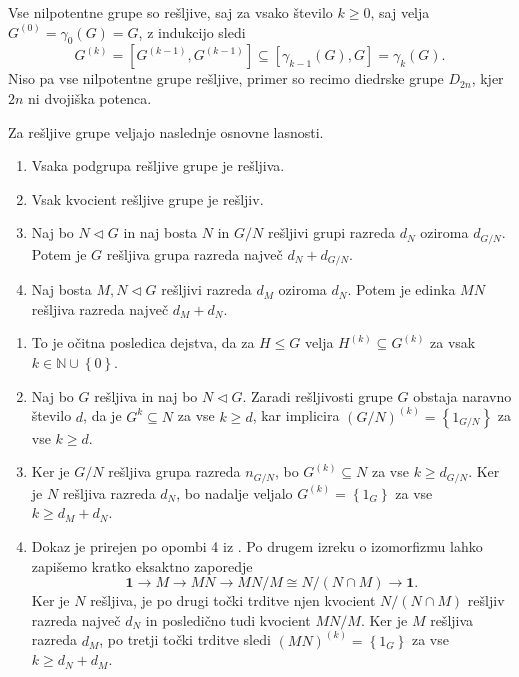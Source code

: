     \begin{primer}
        Vse nilpotentne grupe so rešljive, saj za vsako število $k \ge 0$, saj velja $G^{(0)} = \gamma_0(G) = G$, z indukcijo sledi \begin{equation*}
        G^{(k)} = [G^{(k-1)}, G^{(k-1)}] \subseteq  [\gamma_{k -1}(G), G] = \gamma_{k}(G).
        \end{equation*}
        Niso pa vse nilpotentne grupe rešljive, primer so recimo diedrske grupe $D_{2n}$, kjer $2n$ ni dvojiška potenca. 
    \end{primer}
    
    \begin{trditev}
    \label{trd_lastnosti_resljivih_grup}
    Za rešljive grupe veljajo naslednje osnovne lasnosti.
     \begin{enumerate}
        \item Vsaka podgrupa rešljive grupe je rešljiva.
        \item Vsak kvocient rešljive grupe je rešljiv.
        \item Naj bo $N \triangleleft G$ in naj bosta $N$ in $G / N$ rešljivi grupi razreda $d_{N}$ oziroma $d_{G / N}$. Potem je $G$ rešljiva grupa razreda največ $d_N + d_{G / N}$.
        \item Naj bosta $M, N \triangleleft G$ rešljivi razreda $d_M$ oziroma $d_N$. Potem je edinka $MN$ rešljiva razreda največ $d_M + d_N$.   
     \end{enumerate}
    \end{trditev}
    \begin{dokaz}
        \begin{enumerate}
            \item To je očitna posledica dejstva, da za $H \le G$ velja $H^{(k)} \subseteq G^{(k)}$ za vsak $k \in \mathbb{N} \cup \left\{ 0\right\}$.
            \item Naj bo $G$ rešljiva in naj bo $N \triangleleft G$. Zaradi rešljivosti grupe $G$ obstaja naravno število $d$, da je $G^{k} \subseteq N$ za vse $k \ge d$, kar implicira $ (G / N)^{(k)} = \left\{ 1_{G / N}\right\}$ za vse $k \ge d$. 
            \item Ker je $G / N$ rešljiva grupa razreda $n_{G / N}$, bo $G^{(k)} \subseteq N$ za vse $k \ge d_{G / N}$. Ker je $N$ rešljiva razreda $d_N$, bo nadalje veljalo $G^{(k)} = \left\{ 1_G\right\}$ za vse $k \ge d_M + d_N$.
            \item Dokaz je prirejen po opombi 4 iz \cite[str.4]{Schneider_2016}. Po drugem izreku o izomorfizmu lahko zapišemo kratko eksaktno zaporedje \begin{equation*}
            \mathbf{1} \to M \to MN \to MN / M \cong N / (N \cap M) \to \mathbf{1}.
            \end{equation*}  
            Ker je $N$ rešljiva, je po drugi točki trditve  njen kvocient $ N / (N \cap M)$ rešljiv razreda največ $d_N$ in posledično tudi kvocient $ MN / M $. Ker je $M$ rešljiva razreda $d_M$, po tretji točki trditve sledi $(MN)^{(k)} = \left\{ 1_{G}\right\}$ za vse $k \ge d_N + d_M$.
        \end{enumerate}
    \end{dokaz}

